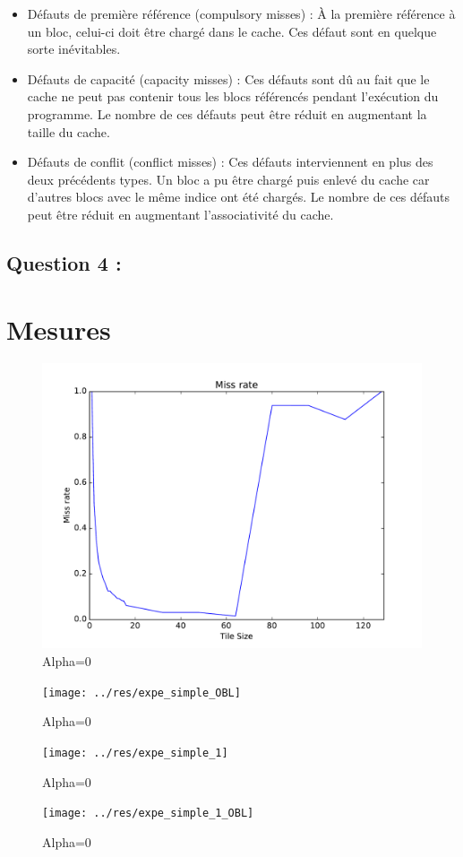 \documentclass[11pt,a4paper]{article}
\begin{document}
\begin{itemize}
    \item Défauts de première référence (compulsory misses) : À la première référence à un bloc, celui-ci doit être chargé dans le cache. Ces défaut sont en quelque sorte inévitables.
    \item Défauts de capacité (capacity misses) : Ces défauts sont dû au fait que le cache ne peut pas contenir tous les blocs référencés pendant l'exécution du programme. Le nombre de ces défauts peut être réduit en augmentant la taille du cache.
    \item Défauts de conflit (conflict misses) : Ces défauts interviennent en plus des deux précédents types. Un bloc a pu être chargé puis enlevé du cache car d'autres blocs avec le même indice ont été chargés. Le nombre de ces défauts peut être réduit en augmentant l'associativité du cache.
\end{itemize}
    
    \subsection{Question 4 :}


    
\section{Mesures}
\begin{figure}[htbp]
  \centering
  \includegraphics[width=0.9\linewidth]{../res/expe_simple}
  \caption{Alpha=0}
  \label{fig:0}
\end{figure}
 \begin{figure}[htbp]
   \centering
   \texttt{[image: ../res/expe\_simple\_OBL]}
   \caption{Alpha=0}
   \label{fig:1}
 \end{figure}
\begin{figure}[htbp]
  \centering
  \texttt{[image: ../res/expe\_simple\_1]}
  \caption{Alpha=0}
  \label{fig:0}
\end{figure}
 \begin{figure}[htbp]
   \centering
   \texttt{[image: ../res/expe\_simple\_1\_OBL]}
   \caption{Alpha=0}
   \label{fig:1}
 \end{figure}
\end{document}
